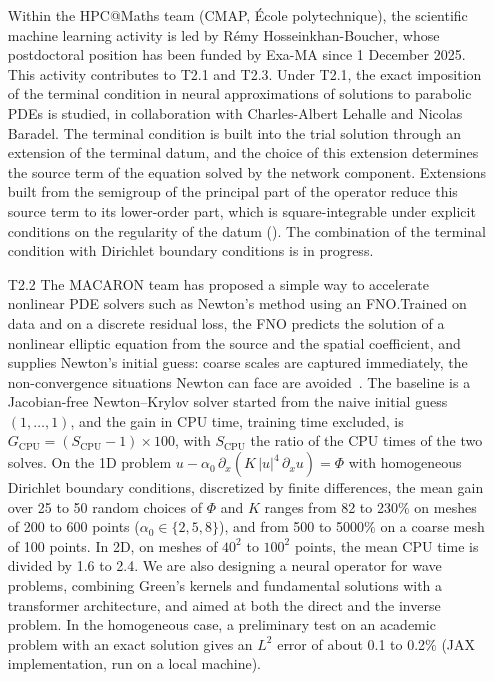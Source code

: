 \begin{itemize}
  Within the HPC@Maths team (CMAP, École polytechnique), the scientific
  machine learning activity is led by Rémy Hos\-sein\-khan-Bou\-cher, whose
  postdoctoral position has been funded by Exa-MA since 1 December 2025.
  This activity contributes to T2.1 and T2.3. Under T2.1, the exact imposition of the terminal condition in neural
  approximations of solutions to parabolic PDEs is studied, in
  collaboration with Charles-Albert Lehalle and Nicolas Baradel. The
  terminal condition is built into the trial solution through an
  extension of the terminal datum, and the choice of this extension
  determines the source term of the equation solved by the network
  component. Extensions built from the semigroup of the principal part of
  the operator reduce this source term to its lower-order part, which is
  square-integrable under explicit conditions on the regularity of the
  datum (). The combination of the terminal
  condition with Dirichlet boundary conditions is in progress.
\item[T2.2] The MACARON  team has proposed a simple  way to accelerate
  nonlinear PDE solvers  such as Newton's method  using an FNO.Trained
  on  data and  on  a discrete  residual loss,  the  FNO predicts  the
  solution of  a nonlinear elliptic  equation from the source  and the
  spatial  coefficient, and  supplies Newton's  initial guess:  coarse
  scales  are  captured  immediately, the  non-convergence  situations
  Newton  can face  are  avoided~\cite{aghili_accelerating_2024}.  The
  baseline  is  a Jacobian-free  Newton--Krylov  solver  started from  the
  naive initial guess $(1, \dots,  1)$, and the gain in CPU time, training
  time excluded,  is  $G_\text{CPU} = (S_\text{CPU} -  1) \times 100$, with
  $S_\text{CPU}$ the  ratio of  the CPU  times of the  two solves.  On the
  1D  problem  $u  -  \alpha_0  \,  \partial_x(K  \,  |u|^4  \,
  \partial_x u) = \Phi$  with homogeneous Dirichlet boundary conditions,
  discretized by finite differences, the mean gain over 25 to 50 random
  choices of $\Phi$ and $K$  ranges from 82 to 230$\%$ on meshes of 200
  to 600 points ($\alpha_0 \in \{2, 5, 8\}$), and from 500 to 5000$\%$ on
  a coarse mesh of 100 points.  In 2D, on meshes of $40^2$ to $100^2$
  points, the mean CPU time is divided by 1.6 to 2.4.
  We are also designing a neural operator for wave problems,
  combining  Green's   kernels  and   fundamental  solutions   with  a
  transformer  architecture, and  aimed  at both  the  direct and  the
  inverse  problem.  In the  homogeneous  case,  a preliminary  test on
  an academic problem  with an exact solution gives an  $L^2$ error of
  about 0.1  to  0.2$\%$  (JAX implementation,  run on  a local
  machine).


\end{itemize}
